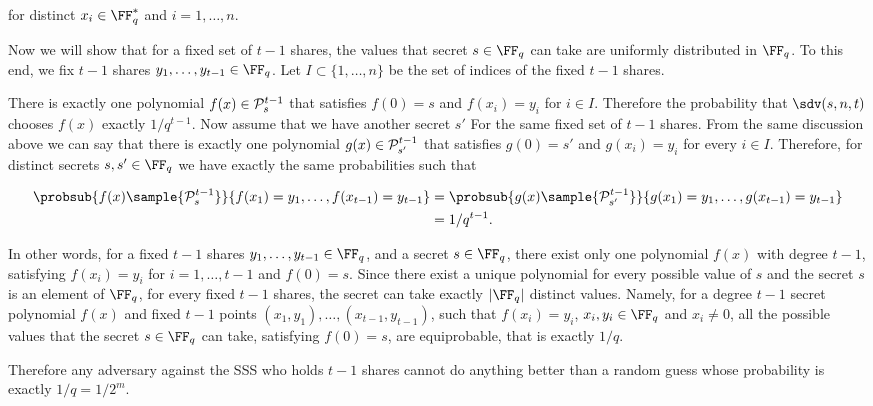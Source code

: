 \documentclass[envcountsame,runningheads,notitlepage]{llncs}
\begin{document}
	for distinct $x_i \in \FF_q^*$ and $i = 1, \ldots, n$.
	
	Now we will show that for a fixed set of $t-1$ shares, the values that secret $s \in \FF_q$ can take are uniformly distributed in $\FF_q$. 
	To this end, we fix $t-1$ shares $y_1, \ldots, y_{t-1} \in \FF_q$. Let  $I \subset \{1, \ldots, n\}$ be the set of indices of the fixed $t-1$ shares. 
	
	There is exactly one polynomial $f(x) \in {\mathcal P}_{s}^{t - 1}$ that satisfies $f(0) = s$ and $f(x_{i}) = y_{i}$ for $i \in I$.
	Therefore the probability that $\sdv(s, n, t)$ chooses $f(x)$ exactly $1/q^{t-1}$.
	Now assume that we have another secret $s'$ For the same fixed set of $t-1$ shares.  
	From the same discussion above we can say that there is exactly one polynomial $g(x) \in {\mathcal P}_{s'}^{t - 1}$ that satisfies $g(0) = s'$ and $g(x_{i}) = y_{i}$ for every $i \in I$.
	Therefore, for distinct secrets $s,s' \in \FF_q$ we have exactly the same probabilities such that
	
	\begin{align*}
		\probsub{f(x) \sample {\sP_{s}^{t - 1}}}{f(x_1) = y_1, \ldots, f(x_{t-1}) = y_{t-1}} &= \probsub{g(x) \sample {\sP_{s'}^{t - 1}}}{g(x_1) = y_1, \ldots, g(x_{t-1}) = y_{t-1}} \\
		&= 1/q^{t-1}.
	\end{align*}
	
	In other words, for a fixed $t-1$ shares $y_1, \ldots, y_{t-1} \in \FF_q$, and a secret $s \in \FF_q$, there exist only one polynomial $f(x)$ with degree $t-1$, satisfying $f(x_i) = y_i$ for $i = 1, \ldots, t-1$ and $f(0) = s$.
	Since there exist a unique polynomial for every possible value of $s$ and the secret $s$ is an element of $\FF_q$, for every fixed $t-1$ shares, the secret can take exactly $|\FF_q|$ distinct values. 
	Namely, for a  degree $t - 1$ secret polynomial $f(x)$ and fixed $t-1$ points $(x_1, y_1), \ldots, (x_{t-1}, y_{t-1})$, such that $f(x_i) = y_i$, $x_i, y_i \in \FF_q$ and $x_i \neq 0$, all the possible values that the secret $s \in \FF_q$ can take, satisfying $f(0) = s$, are equiprobable, that is exactly $1/q$.  
	
	Therefore any adversary against the SSS who holds $t-1$ shares cannot do anything better than a random guess whose probability is exactly $1/q = 1/2^m$.
	
\end{document}
